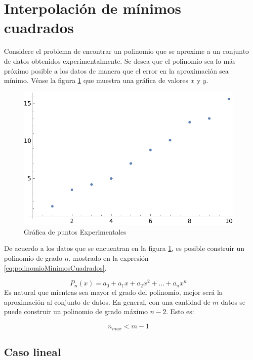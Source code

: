 \section{Interpolación de mínimos cuadrados}

Considere el problema de encontrar un polinomio que se aproxime a un conjunto de datos obtenidos experimentalmente.
Se desea que el polinomio sea lo más próximo posible a los datos de manera que el error en la aproximación sea mínimo.  
Véase la figura \ref{fig:minimosCuadrados1} que muestra una gráfica de valores $x$ y $y$. 

\begin{figure}[H]
  \centering
  \includegraphics[scale=1]{img/minimosCuadradosLineales1.pdf}
  \caption{Gráfica de puntos Experimentales}
  \label{fig:minimosCuadrados1}
\end{figure}

De acuerdo a los datos que se encuentran en la figura \ref{fig:minimosCuadrados1}, es posible construir un polinomio de grado $n$, 
mostrado en la expresión \ref{eq:polinomioMinimosCuadrados}. 

\begin{equation}
	P_n(x) = a_0 + a_1x + a_2x^2 + \dots + a_nx^n
	\label{eq:polinomioMinimosCuadrados}
\end{equation}
Es natural que mientras sea mayor el grado del polinomio, mejor será la aproximación al conjunto de datos. En general, con una cantidad
de $m$ datos se puede construir un polinomio de grado máximo $n-2$. Esto es:

\[ n_{max} < m-1 \]

\subsection{Caso lineal}

